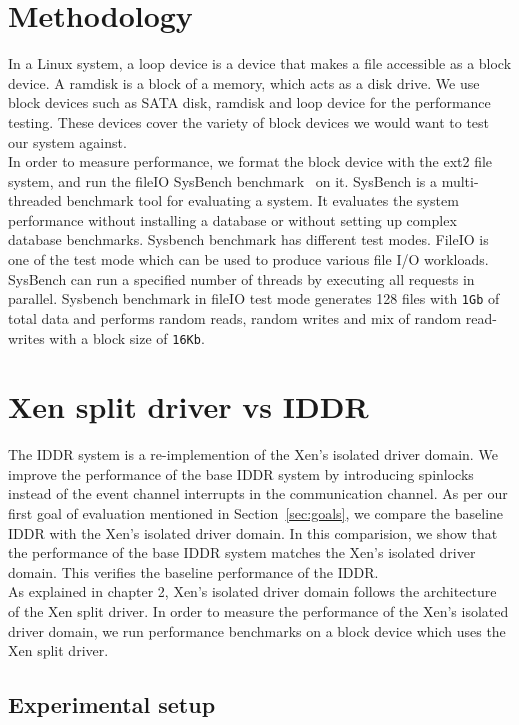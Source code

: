\section{Methodology}
In a Linux system, a loop device is a device that makes a file accessible as a block device. A ramdisk is a block of a memory, which acts as a disk drive. We use block devices such as SATA disk, ramdisk and loop device for the performance testing. These devices cover the variety of block devices we would want to test our system against.
\\[3mm]
In order to measure performance, we format the block device with the ext2 file system, and run the fileIO SysBench benchmark~\cite{sysbench} on it. SysBench is a multi-threaded benchmark tool for evaluating a system. It evaluates the system performance without installing a database or without setting up complex database benchmarks. Sysbench benchmark has different test modes. FileIO is one of the test mode which can be used to produce various file I/O workloads. SysBench can run a specified number of threads by executing all requests in parallel. Sysbench benchmark in fileIO test mode generates 128 files with \texttt{1Gb} of total data and performs random reads, random writes and mix of random read-writes with a block size of \texttt{16Kb}. 

\section{Xen split driver vs IDDR}
The IDDR system is a re-implemention of the Xen's isolated driver domain. We improve the performance of the base IDDR system by introducing spinlocks instead of the event channel interrupts in the communication channel. As per our first goal of evaluation mentioned in Section~\ref{sec:goals}, we compare the baseline IDDR with the Xen's isolated driver domain. In this comparision, we show that the performance of the base IDDR system matches the Xen's isolated driver domain. This verifies the baseline performance of the IDDR.
\\[3mm]
As explained in chapter 2, Xen's isolated driver domain follows the architecture of the Xen split driver. In order to measure the performance of the Xen's isolated driver domain, we run performance benchmarks on a block device which uses the Xen split driver.

\subsection{Experimental setup}

